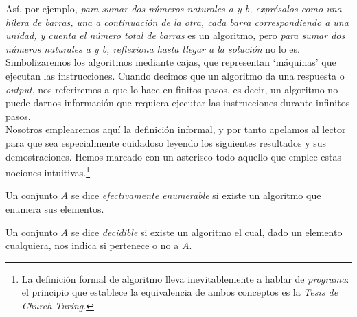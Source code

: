 Así, por ejemplo, \textit{para sumar dos números naturales a y b, exprésalos como una hilera de barras, una a continuación de la otra, cada barra correspondiendo a una unidad, y cuenta el número total de barras} es un algoritmo, pero \textit{para sumar dos números naturales a y b, reflexiona hasta llegar a la solución} no lo es.\\

Simbolizaremos los algoritmos mediante cajas, que representan `máquinas' que ejecutan las instrucciones. Cuando decimos que un algoritmo da una respuesta o \textit{output}, nos referiremos a que lo hace en finitos pasos, es decir, un algoritmo no puede darnos información que requiera ejecutar las instrucciones durante infinitos pasos.\\

Nosotros emplearemos aquí la definición informal, y por tanto apelamos al lector para que sea especialmente cuidadoso leyendo los siguientes resultados y sus demostraciones. Hemos marcado con un asterisco todo aquello que emplee estas nociones intuitivas.\footnote{La definición formal de algoritmo lleva inevitablemente a hablar de \textit{programa}: el principio que establece la equivalencia de ambos conceptos es la \textit{Tesis de Church-Turing}.}\\

\begin{definition*}
Un conjunto $A$ se dice \textit{efectivamente enumerable} si existe un algoritmo que enumera sus elementos.
\end{definition*}


\begin{definition*}
Un conjunto $A$ se dice \textit{decidible} si existe un algoritmo el cual, dado un elemento cualquiera, nos indica si pertenece o no a $A$.
\end{definition*}


